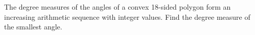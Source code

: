 The degree measures of the angles of a convex 18-sided polygon form an increasing arithmetic sequence with integer values. Find the degree measure of the smallest angle.